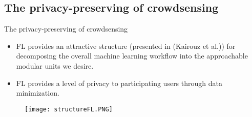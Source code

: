 
\subsection{The privacy-preserving of crowdsensing}
\begin{frame}{The privacy-preserving of crowdsensing}
    \begin{itemize}
        \item FL provides an attractive structure (presented in (Kairouz et al.)) for decomposing the overall machine learning workflow into the approachable modular units we desire.
        \item FL provides a level of privacy to participating users through data minimization.
    \end{itemize}
    \begin{figure}[h]
        \centering
        \texttt{[image: structureFL.PNG]}
    \end{figure}
\end{frame}

